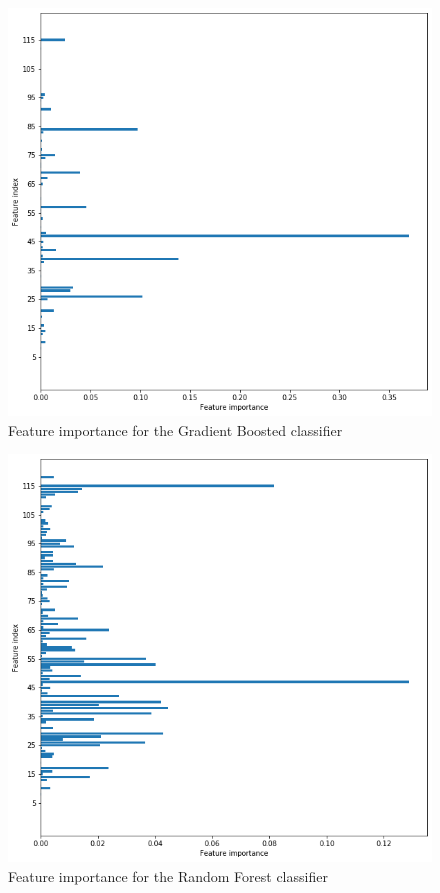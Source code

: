\begin{appendix}
    \begin{figure}[ht]
    \centering
      \includegraphics[width=\linewidth]{Figures/fs_gradientboosted.png}
      \caption{Feature importance for the Gradient Boosted classifier}
      \label{fig:fs_gradientboosted}
    \end{figure}
    
    \begin{figure}[ht]
    \centering
      \includegraphics[width=\linewidth]{Figures/fs_randomforest.png}
      \caption{Feature importance for the Random Forest classifier}
      \label{fig:fs_randomforest}
    \end{figure}
    


\end{appendix}
